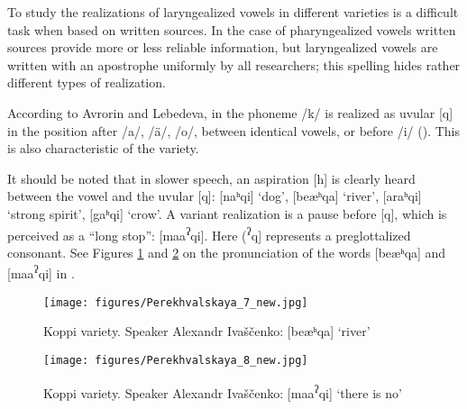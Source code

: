\documentclass[output=paper,colorlinks,citecolor=brown]{langscibook}
\begin{document}
To study the realizations of laryngealized vowels in different  varieties is a difficult task when based on written sources. In the case of pharyngealized vowels written sources provide more or less reliable information, but laryngealized vowels are written with an apostrophe uniformly by all researchers; this spelling hides rather different types of realization. 


According to Avrorin and Lebedeva, in  the phoneme /k/ is realized as uvular [q] in the position after /a/, /ä/, /o/, between identical vowels, or before /i/ (\citealt{AvrorinLebedeva1978}). This is also characteristic of the  variety. 

It should be noted that in slower speech, an aspiration [h] is clearly heard between the vowel and the uvular [q]: [naʰqi] ‘dog’, [beæʰqa] ‘river’, [araʰqi] ‘strong spirit’, [gaʰqi] ‘crow’. A variant realization is a pause before [q], which is perceived as a “long stop”: [maa\textsuperscript{{ʔ}}qi]. Here (\textsuperscript{{ʔ}}q] represents a preglottalized consonant. See Figures \ref{fig:7:7} and \ref{fig:7:8} on the pronunciation of the words [beæʰqa] and [maa\textsuperscript{{ʔ}}qi] in .


\begin{figure}
\texttt{[image: figures/Perekhvalskaya\_7\_new.jpg]}
\caption{Koppi variety. Speaker Alexandr Ivaščenko: [beæʰqa] ‘river’}
\label{fig:7:7}
\end{figure}


\begin{figure}
\texttt{[image: figures/Perekhvalskaya\_8\_new.jpg]}
\caption{Koppi variety. Speaker Alexandr Ivaščenko: [maa\textsuperscript{{ʔ}}qi] ‘there is no’}
\label{fig:7:8}
\end{figure}
\end{document}
